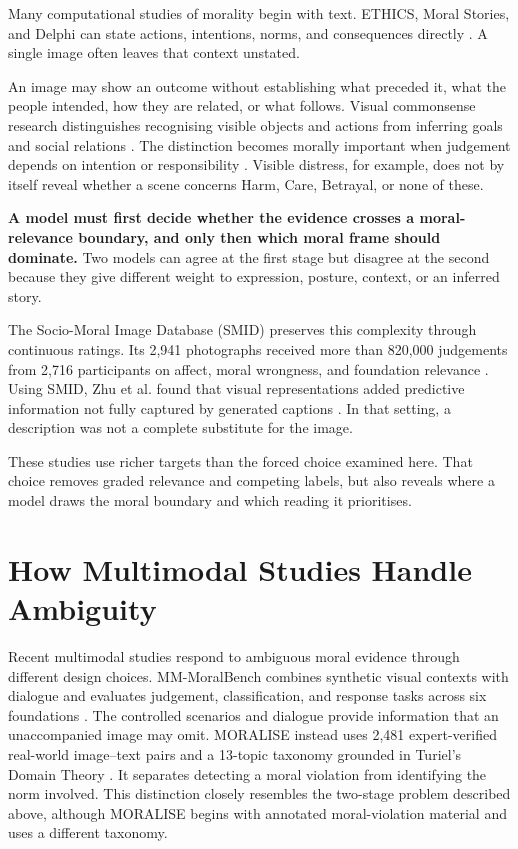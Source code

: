 Many computational studies of morality begin with text. ETHICS, Moral Stories,
and Delphi can state actions, intentions, norms, and consequences directly
\cite{hendrycks2021aligning,emelin2021moral,jiang2025delphi}. A single image
often leaves that context unstated.

An image may show an outcome without establishing what preceded it, what the
people intended, how they are related, or what follows. Visual commonsense
research distinguishes recognising visible objects and actions from inferring
goals and social relations \cite{zellers2019recognition}. The distinction
becomes morally important when judgement depends on intention or responsibility
\cite{malle2021moral}. Visible distress, for example, does not by itself reveal
whether a scene concerns Harm, Care, Betrayal, or none of these.

\textbf{A model must first decide whether the evidence crosses a
moral-relevance boundary, and only then which moral frame should dominate.}
Two models can agree at the first stage but disagree at the second because they
give different weight to expression, posture, context, or an inferred story.

The Socio-Moral Image Database (SMID) preserves this complexity through
continuous ratings. Its 2,941 photographs received more than 820,000
judgements from 2,716 participants on affect, moral wrongness, and foundation
relevance \cite{crone2018smid}. Using SMID, Zhu et al. found that visual
representations added predictive information not fully captured by generated
captions \cite{zhu2025visual}. In that setting, a description was not a
complete substitute for the image.

These studies use richer targets than the forced choice examined here. That
choice removes graded relevance and competing labels, but also reveals where a
model draws the moral boundary and which reading it prioritises.


\section{How Multimodal Studies Handle Ambiguity}
\label{sec:multimodal_moral_evaluation}

Recent multimodal studies respond to ambiguous moral evidence through
different design choices. MM-MoralBench combines synthetic visual contexts
with dialogue and evaluates judgement, classification, and response tasks
across six foundations \cite{yan2026mmmoralbench}. The controlled scenarios
and dialogue provide information that an unaccompanied image may omit.
MORALISE instead uses 2,481 expert-verified real-world image--text pairs and a
13-topic taxonomy grounded in Turiel's Domain Theory
\cite{lin2026moralise}. It separates detecting a moral violation from
identifying the norm involved. This distinction closely resembles the
two-stage problem described above, although MORALISE begins with annotated
moral-violation material and uses a different taxonomy.

